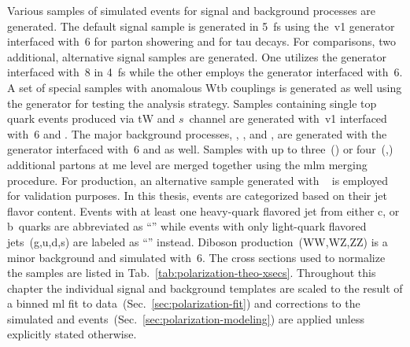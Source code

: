 Various samples of simulated events for signal and background processes are generated. The default signal sample is generated in 5~\gls{fs} using the \POWHEG\,v1 generator interfaced with \PYTHIA\,6 for parton showering and \TAUOLA for tau decays. For comparisons, two additional, alternative signal samples are generated. One utilizes the \AMC generator interfaced with \PYTHIA\,8 in 4~\gls{fs} while the other employs the \COMPHEP generator interfaced with \PYTHIA\,6. A set of special samples with anomalous Wtb couplings is generated as well using the \COMPHEP generator for testing the analysis strategy. Samples containing single top quark events produced via tW and $s$~channel are generated with \POWHEG\,v1 interfaced with \PYTHIA\,6 and \TAUOLA. The major background processes, \wjets, \zjets, and \ttbar, are generated with the \MG generator interfaced with \PYTHIA\,6 and \TAUOLA as well. Samples with up to three~(\ttbar) or four~(\wjets,\zjets) additional partons at \gls{me} level are merged together using the \gls{mlm} merging procedure. For \wjets production, an alternative sample generated with \SHERPA~\cite{Hoeche:2012ft} is employed for validation purposes. In this thesis, \wjets events are categorized based on their jet flavor content. Events with at least one heavy-quark flavored jet from either c, or b~quarks are abbreviated as ``'' while events with only light-quark flavored jets~(g,u,d,s) are labeled as ``'' instead. Diboson production~(WW,WZ,ZZ) is a minor background and simulated with \PYTHIA\,6. The cross sections used to normalize the samples are listed in Tab.~\ref{tab:polarization-theo-xsecs}. Throughout this chapter the individual signal and background templates are scaled to the result of a binned \gls{ml} fit to data~(Sec.~\ref{sec:polarization-fit}) and corrections to the simulated \wjets and \ttbar events~(Sec.~\ref{sec:polarization-modeling}) are applied unless explicitly stated otherwise.


